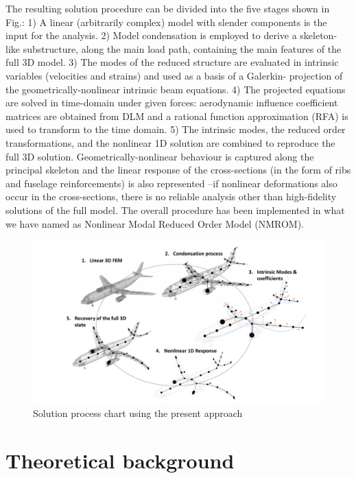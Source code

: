 \documentclass[11pt]{article}
\begin{document}
The resulting solution procedure can be divided into the five stages shown in Fig.: 1) A
linear (arbitrarily complex) model with slender components is the input for the analysis. 2)
Model condensation is employed to derive a skeleton-like substructure, along the main load
path, containing the main features of the full 3D model. 3) The modes of the reduced structure
are evaluated in intrinsic variables (velocities and strains) and used as a basis of a Galerkin-
projection of the geometrically-nonlinear intrinsic beam equations. 4) The projected equations
are solved in time-domain under given forces: aerodynamic influence coefficient matrices are
obtained from DLM and a rational function approximation (RFA) is used to transform to the
time domain. 5) The intrinsic modes, the reduced order transformations, and the nonlinear 1D
solution are combined to reproduce the full 3D solution. Geometrically-nonlinear behaviour
is captured along the principal skeleton and the linear response of the cross-sections (in the
form of ribs and fuselage reinforcements) is also represented –if nonlinear deformations also
occur in the cross-sections, there is no reliable analysis other than high-fidelity solutions of the
full model. The overall procedure has been implemented in what we have named as Nonlinear
Modal Reduced Order Model (NMROM).
\begin{figure}[htbp]
\centering
\includegraphics[width=.75\linewidth]{./img/aircraft_process.pdf}
\caption{\label{fig:org4a19cf9}Solution process chart using the present approach}
\end{figure} 
%
\section{Theoretical background}
\label{sec:org068f350}
\end{document}
